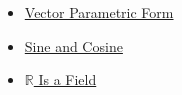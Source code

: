 \begin{dependencies}
\begin{itemize}
  \item \hyperref[def:vector-parametric-form]{Vector Parametric Form}
  \item \hyperref[def:sine-cosine]{Sine and Cosine}
  \item \hyperref[thm:r-is-a-field]{$\mathbb{R}$ Is a Field}
\end{itemize}
\end{dependencies}
